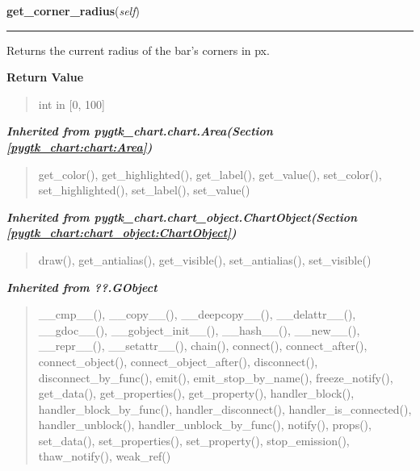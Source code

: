     \label{pygtk_chart:bar_chart:Bar:get_corner_radius}

    \vspace{0.5ex}

\hspace{.8\funcindent}\begin{boxedminipage}{\funcwidth}

    \raggedright \textbf{get\_corner\_radius}(\textit{self})

    \vspace{-1.5ex}

    \rule{\textwidth}{0.5\fboxrule}
\setlength{\parskip}{2ex}
    Returns the current radius of the bar's corners in px.

\setlength{\parskip}{1ex}
      \textbf{Return Value}
    \vspace{-1ex}

      \begin{quote}
      int in [0, 100]

      \end{quote}

    \end{boxedminipage}


\large{\textbf{\textit{Inherited from pygtk\_chart.chart.Area\textit{(Section \ref{pygtk_chart:chart:Area})}}}}

\begin{quote}
get\_color(), get\_highlighted(), get\_label(), get\_value(), set\_color(), set\_highlighted(), set\_label(), set\_value()
\end{quote}

\large{\textbf{\textit{Inherited from pygtk\_chart.chart\_object.ChartObject\textit{(Section \ref{pygtk_chart:chart_object:ChartObject})}}}}

\begin{quote}
draw(), get\_antialias(), get\_visible(), set\_antialias(), set\_visible()
\end{quote}

\large{\textbf{\textit{Inherited from ??.GObject}}}

\begin{quote}
\_\_cmp\_\_(), \_\_copy\_\_(), \_\_deepcopy\_\_(), \_\_delattr\_\_(), \_\_gdoc\_\_(), \_\_gobject\_init\_\_(), \_\_hash\_\_(), \_\_new\_\_(), \_\_repr\_\_(), \_\_setattr\_\_(), chain(), connect(), connect\_after(), connect\_object(), connect\_object\_after(), disconnect(), disconnect\_by\_func(), emit(), emit\_stop\_by\_name(), freeze\_notify(), get\_data(), get\_properties(), get\_property(), handler\_block(), handler\_block\_by\_func(), handler\_disconnect(), handler\_is\_connected(), handler\_unblock(), handler\_unblock\_by\_func(), notify(), props(), set\_data(), set\_properties(), set\_property(), stop\_emission(), thaw\_notify(), weak\_ref()
\end{quote}

